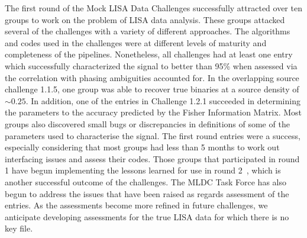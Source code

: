 \documentclass[12pt]{iopart}
\begin{document}
The first round of the Mock LISA Data Challenges successfully attracted over ten groups to work on the problem of LISA data analysis. These groups attacked several of the challenges with a variety of different approaches. The algorithms and codes used in the challenges were at different levels of maturity and completeness of the pipelines. Nonetheless, all challenges had at least one entry which successfully characterized the signal to better than 95\% when assessed via the correlation with phasing ambiguities accounted for. In the overlapping source challenge 1.1.5, one group was able to recover true binaries at a source density of $\sim 0.25$. In addition, one of the entries in Challenge 1.2.1 succeeded in determining the parameters to the accuracy predicted by the Fisher Information Matrix. Most groups also discovered small bugs or discrepancies in definitions of some of the parameters used to characterise the signal. The first round entries were a success, especially considering that most groups had less than 5 months to work out interfacing issues and assess their codes. Those groups that participated in round 1 have begun implementing the lessons learned for use in round 2~\cite{MLDC2doc}, which is another successful outcome of the challenges. The MLDC Task Force has also begun to address the issues that have been raised as regards assessment of the entries. As the assessments become more refined in future challenges, we anticipate developing assessments for the true LISA data for which there is no key file.
\end{document}
